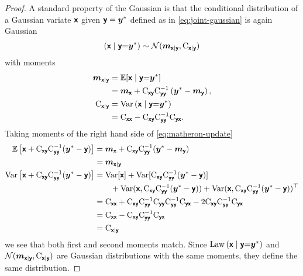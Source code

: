 \documentclass{article}
\begin{document}
\begin{proof}
    A standard property of the Gaussian \citep[e.g.][]{Petersen2012Matrix} is that the conditional distribution of a Gaussian variate  $\vrv{x}$ given $\vrv{y} = \vv{y}^*$ defined as in \eqref{eq:joint-gaussian} is again Gaussian
    \begin{align}
        \left(\vrv{x} \gvn \vrv{y} {=} \vv{y}^*\right)
        \sim\Normal(\vv{m}_{\vrv{x}|\vrv{y}}, \mm{C}_{\vrv{x}|\vrv{y}})
    \end{align}
    with moments
    \begin{align}
        \vv{m}_{\vrv{x}|\vrv{y}}
            &=\Ex [\vrv{x} \gvn \vrv{y} {=} \vv{y}^*] \notag\\
            &= \vv{m}_{\vrv{x}} + \mm{C}_{\vrv{xy}} \mm{C}_{\vrv{yy}}^{-1} \left( \vv{y}^* - \vv{m}_{\vrv{y}} \right), \label{eq:conditional-mean}\\
        \mm{C}_{\vrv{x}|\vrv{y}}
            &= \var \left(\vrv{x} \gvn \vrv{y} {=} \vv{y}^*\right) \notag\\
            &= \mm{C}_{\vrv{xx}} - \mm{C}_{\vrv{xy}} \mm{C}_{\vrv{yy}}^{-1} \mm{C}_{\vrv{yx}}. \label{eq:conditional-cov}
    \end{align}
Taking moments of the right hand side of \eqref{eq:matheron-update}
\begin{align}
\Ex\left[\vrv{x}+\mm{C}_{\vrv{xy}} \mm{C}_{\vrv{yy}}^{-1}(\vv{y}^*-\vrv{y})\right]
&=\vv{m}_{\vrv{x}} +\mm{C}_{\vrv{xy}}\mm{C}_{\vrv{yy}}^{-1}(\vv{y}^*-\vv{m}_{\vrv{y}})\\
&=\vv{m}_{\vrv{x}|\vrv{y}}\\
\var\left[\vrv{x}+\mm{C}_{\vrv{xy}} \mm{C}_{\vrv{yy}}^{-1}(\vv{y}^*-\vrv{y})\right]
&=
    \var[\vrv{x}]+\var[\mm{C}_{\vrv{xy}} \mm{C}_{\vrv{yy}}^{-1}(\vv{y}^*-\vrv{y})] \notag \\
    &\hspace{2em} +\var(\vrv{x},\mm{C}_{\vrv{xy}} \mm{C}_{\vrv{yy}}^{-1}(\vv{y}^*-\vrv{y}))
    +\var(\vrv{x},\mm{C}_{\vrv{xy}} \mm{C}_{\vrv{yy}}^{-1}(\vv{y}^*-\vrv{y}))^{\top}\\
&=\mm{C}_{\vrv{x}\vrv{x}} +\mm{C}_{\vrv{xy}} \mm{C}_{\vrv{yy}}^{-1}\mm{C}_{\vrv{yy}} \mm{C}_{\vrv{yy}}^{-1}\mm{C}_{\vrv{yx}}
-  2\mm{C}_{\vrv{xy}} \mm{C}_{\vrv{yy}}^{-1}\mm{C}_{\vrv{yx}}\\
&=\mm{C}_{\vrv{x}\vrv{x}} -\mm{C}_{\vrv{xy}} \mm{C}_{\vrv{yy}}^{-1}\mm{C}_{\vrv{yx}}\\
&=\mm{C}_{\vrv{x}|\vrv{y}}
\end{align}
we see that both first and second moments match.
Since $\Law\left(\vrv{x} \gvn \vrv{y} {=} \vv{y}^*\right)$ and
$\Normal(\vv{m}_{\vrv{x}|\vrv{y}}, \mm{C}_{\vrv{x}|\vrv{y}})$ are Gaussian distributions with the same moments, they define the same distribution.
\end{proof}
\end{document}
